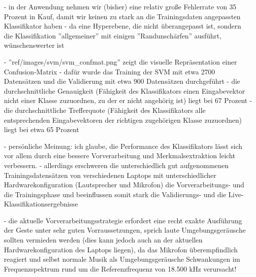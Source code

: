 - in der Anwendung nehmen wir (bisher) eine relativ große Fehlerrate von 35 Prozent in Kauf, damit wir keinen zu stark an die Trainingsdaten angepassten Klassifikator haben
- da eine Hyperebene, die nicht überangepasst ist, sondern die Klassifikation ''allgemeiner'' mit einigen ''Randunschärfen'' ausführt, wünschenswerter ist

- ''ref/images/svm/svm\_confmat.png'' zeigt die visuelle Repräsentation einer Confusion-Matrix
- dafür wurde das Training der SVM mit etwa 2700 Datensätzen und die Validierung mit etwa 900 Datensätzen durchgeführt
- die durchschnittliche Genauigkeit (Fähigkeit des Klassifikators einen Eingabevektor nicht einer Klasse zuzuordnen, zu der er nicht angehörig ist) liegt bei 67 Prozent
- die durchschnittliche Trefferquote (Fähigkeit des Klassifikators alle entsprechenden Eingabevektoren der richtigen zugehörigen Klasse zuzuordnen) liegt bei etwa 65 Prozent

- persönliche Meinung: ich glaube, die Performance des Klassifikators lässt sich vor allem durch eine bessere Vorverarbeitung und Merkmalsextraktion leicht verbessern.
- allerdings erschweren die unterschiedlich gut aufgenommenen Trainingsdatensätzen von verschiedenen Laptops mit unterschiedlicher Hardwarekonfiguration (Lautsprecher und Mikrofon) die Vorverarbeitungs- und die Trainingsphase und beeinflussen somit stark die Validierungs- und die Live-Klassifikationsergebnisse

- die aktuelle Vorverarbeitungsstrategie erfordert eine recht exakte Ausführung der Geste unter sehr guten Vorraussetzungen, sprich laute Umgebungsgeräusche sollten vermieden werden (dies kann jedoch auch an der aktuellen Hardwarekonfiguration des Laptops liegen), da das Mikrofon überempfindlich reagiert und selbst normale Musik als Umgebungsgeräusche Schwankungen im Frequenzspektrum rund um die Referenzfrequenz von 18.500 kHz verursacht!
